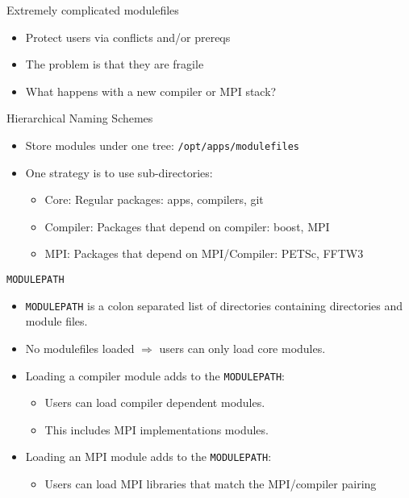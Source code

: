 \documentclass[dvipsnames,aspectratio=169]{beamer}
\begin{document}
\begin{frame}{Extremely complicated modulefiles}
  \begin{itemize}
    \item Protect users via conflicts and/or prereqs
    \item The problem is that they are fragile
    \item What happens with a new compiler or MPI stack?
  \end{itemize}
\end{frame}

\begin{frame}{Hierarchical Naming Schemes}
  \begin{itemize}
    \item Store modules under one tree: \texttt{/opt/apps/modulefiles}
    \item One strategy is to use sub-directories:
      \begin{itemize}
        \item Core: Regular packages: apps, compilers, git
        \item Compiler: Packages that depend on compiler: boost, MPI
        \item MPI: Packages that depend on MPI/Compiler: PETSc, FFTW3
      \end{itemize}
  \end{itemize}
\end{frame}

\begin{frame}{\texttt{MODULEPATH}}
  \begin{itemize}
    \item \texttt{MODULEPATH} is a colon separated list of directories
      containing directories and module files.
    \item No modulefiles loaded $\Rightarrow$ users can only load core modules.
    \item Loading a compiler module adds to the \texttt{MODULEPATH}:
      \begin{itemize}
        \item Users can load compiler dependent modules.
        \item This includes MPI implementations modules.
      \end{itemize}
    \item Loading an MPI module adds to the \texttt{MODULEPATH}:
      \begin{itemize}
        \item Users can load MPI libraries that match the MPI/compiler pairing
      \end{itemize}
  \end{itemize}
\end{frame}
\end{document}
